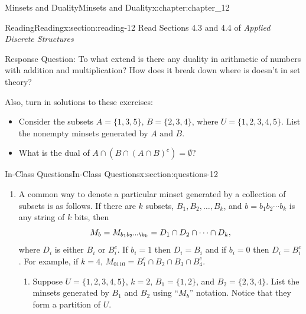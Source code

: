 \documentclass[oneside,10pt,]{book}
\numberwithin{equation}{section}
\begin{document}
\begin{chapterptx}{Minsets and Duality}{}{Minsets and Duality}{}{}{x:chapter:chapter_12}
\index{}%
%
%
\typeout{************************************************}
\typeout{************************************************}
%
\begin{sectionptx}{Reading}{}{Reading}{}{}{x:section:reading-12}
Read Sections 4.3 and 4.4 of \emph{Applied Discrete Structures}%
\par
Response Question: To what extend is there any duality in arithmetic of numbers with addition and multiplication?  How does it break down where is doesn't in set theory?%
\par
Also, turn in solutions to these exercises:%
\begin{itemize}[label=\textbullet]
\item{}Consider the subsets \(A = \{1, 3, 5\}\), \(B = \{2,3,4\}\),  where \(U = \{1,2,3,4,5\}\).  List the nonempty minsets generated by \(A\textrm{ and }B\).%
\item{}What is the dual of \(A \cap (B\cap (A\cap B)^c)= \emptyset\)?%
\end{itemize}
%
\end{sectionptx}
%
%
\typeout{************************************************}
\typeout{************************************************}
%
\begin{sectionptx}{In-Class Questions}{}{In-Class Questions}{}{}{x:section:questions-12}
%
\begin{enumerate}[label=\arabic*.]
\item{}A common way to denote a particular minset generated by a collection of subsets is as follows.  If there are \(k\) subsets, \(B_1, B_2, \dots ,B_k\), and \(b=b_1b_2\cdots b_k\) is any string of \(k\) bits, then%
\begin{equation*}
M_b =  M_{b_1b_2\cdots \b_k} = D_1 \cap D_2 \cap \cdots \cap D_k,
\end{equation*}
where \(D_i\) is either \(B_i\) or \(B_i^c\).  If \(b_i = 1\) then \(D_i =B_i\) and if \(b_i=0\) then \(D_i=B_i^c\).  For example, if \(k=4\), \(M_{0110} = B_1^c \cap B_2 \cap B_3 \cap B_4^c\).%
\begin{enumerate}[label=(\alph*)]
\item{}Suppose \(U=\{1, 2, 3, 4, 5\}\), \(k=2\), \(B_1= \{1, 2\}\), and \(B_2 = \{2,3,4\}\).  List the minsets generated by \(B_1\) and \(B_2\) using ``\(M_b\)'' notation. Notice that they form a partition of \(U\).%

\end{enumerate}
\end{enumerate}
\end{sectionptx}
\end{chapterptx}
\end{document}
